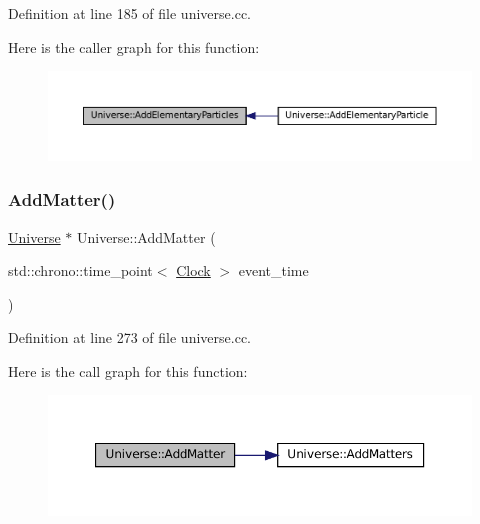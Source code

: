 Definition at line 185 of file universe.\+cc.

Here is the caller graph for this function\+:\nopagebreak
\begin{figure}[H]
\begin{center}
\leavevmode
\includegraphics[width=350pt]{class_universe_a857cf7f208cd11c80736e82fa523feb5_icgraph}
\end{center}
\end{figure}
\mbox{\label{class_universe_a090d9ad1b88d81364e872e17d65edca4}} 
\subsubsection{\texorpdfstring{Add\+Matter()}{AddMatter()}}
{\footnotesize\ttfamily \mbox{\hyperlink{class_universe}{Universe}} $\ast$ Universe\+::\+Add\+Matter (\begin{DoxyParamCaption}\item[{std\+::chrono\+::time\+\_\+point$<$ \mbox{\hyperlink{universe_8h_a0ef8d951d1ca5ab3cfaf7ab4c7a6fd80}{Clock}} $>$}]{event\+\_\+time }\end{DoxyParamCaption})}



Definition at line 273 of file universe.\+cc.

Here is the call graph for this function\+:\nopagebreak
\begin{figure}[H]
\begin{center}
\leavevmode
\includegraphics[width=350pt]{class_universe_a090d9ad1b88d81364e872e17d65edca4_cgraph}
\end{center}
\end{figure}
\mbox{\label{class_universe_ae00d10b2a23c9cedf1ff89e9da875563}} 
